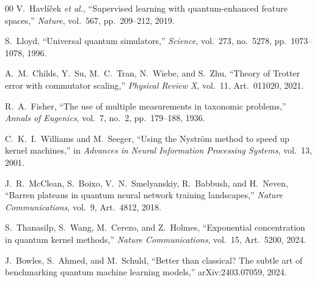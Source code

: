\documentclass[conference]{IEEEtran}
\begin{document}
\begin{thebibliography}{00}
V.~Havl\'{i}\v{c}ek \textit{et al.},
``Supervised learning with quantum-enhanced feature spaces,''
\textit{Nature}, vol.~567, pp.~209--212, 2019.

S.~Lloyd,
``Universal quantum simulators,''
\textit{Science}, vol.~273, no.~5278, pp.~1073--1078, 1996.

A.~M.~Childs, Y.~Su, M.~C.~Tran, N.~Wiebe, and S.~Zhu,
``Theory of Trotter error with commutator scaling,''
\textit{Physical Review X}, vol.~11, Art.~011020, 2021.

R.~A.~Fisher,
``The use of multiple measurements in taxonomic problems,''
\textit{Annals of Eugenics}, vol.~7, no.~2, pp.~179--188, 1936.

C.~K.~I.~Williams and M.~Seeger,
``Using the Nystr\"om method to speed up kernel machines,''
in \textit{Advances in Neural Information Processing Systems}, vol.~13, 2001.

J.~R.~McClean, S.~Boixo, V.~N.~Smelyanskiy, R.~Babbush, and H.~Neven,
``Barren plateaus in quantum neural network training landscapes,''
\textit{Nature Communications}, vol.~9, Art.~4812, 2018.

S.~Thanasilp, S.~Wang, M.~Cerezo, and Z.~Holmes,
``Exponential concentration in quantum kernel methods,''
\textit{Nature Communications}, vol.~15, Art.~5200, 2024.

J.~Bowles, S.~Ahmed, and M.~Schuld,
``Better than classical? The subtle art of benchmarking quantum machine learning models,''
arXiv:2403.07059, 2024.
\end{thebibliography}
\end{document}
